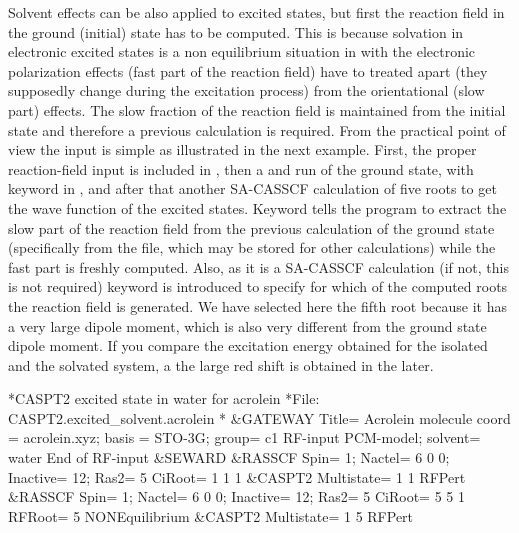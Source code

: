 Solvent effects can be also applied to excited states, but first the reaction
field in the ground (initial) state has to be computed. This is because solvation in
electronic excited states is a non equilibrium situation in with the electronic
polarization effects (fast part of the reaction field) have to treated apart
(they supposedly change during the excitation process) from the orientational
(slow part) effects. The slow fraction of the reaction field is maintained from
the initial state and therefore a previous calculation is required. 
From the practical point of view the input is simple as illustrated in the next 
example. First, the proper reaction-field
input is included in , then a  and 
run of the ground state, with keyword  in ,
and after that another SA-CASSCF calculation of five roots to get the wave function
of the excited states. Keyword  tells the program to extract
the slow part of the reaction field from the previous calculation of the ground
state (specifically from the  file, which may be stored for other
calculations) while the fast part is freshly computed. Also, as it is a SA-CASSCF
calculation (if not, this is not required) keyword  is introduced
to specify for which of the computed roots the reaction field is generated. We have
selected here the fifth root because it has a very large dipole moment, which is
also very different from the ground state dipole moment. If you compare the excitation
energy obtained for the isolated and the solvated system, a the large red shift is 
obtained in the later.

\begin{inputlisting}
*CASPT2 excited state in water for acrolein
*File: CASPT2.excited_solvent.acrolein
*
&GATEWAY  
  Title= Acrolein molecule
  coord = acrolein.xyz; basis = STO-3G; group= c1
  RF-input
   PCM-model; solvent= water
  End of RF-input
&SEWARD  
&RASSCF 
  Spin= 1; Nactel= 6 0 0; Inactive= 12; Ras2= 5
  CiRoot= 1 1 1
&CASPT2 
  Multistate= 1 1
  RFPert
&RASSCF 
  Spin= 1; Nactel= 6 0 0; Inactive= 12; Ras2= 5
  CiRoot= 5 5 1
  RFRoot= 5
  NONEquilibrium
&CASPT2 
  Multistate= 1 5
  RFPert
\end{inputlisting}

